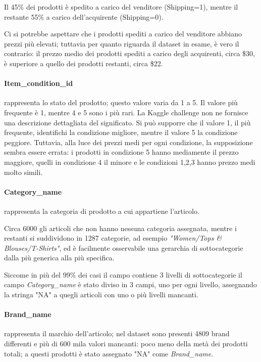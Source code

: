 Il 45\% dei prodotti è spedito a carico del venditore (Shipping=1), mentre il
restante 55\% a carico dell'acquirente (Shipping=0).

Ci si potrebbe aspettare che i prodotti spediti a carico del venditore abbiano
prezzi più elevati; tuttavia  per quanto riguarda il dataset in
esame, è vero il contrario: il prezzo medio dei prodotti spediti a carico degli
acquirenti, circa \$30, è superiore a quello dei prodotti restanti,
circa \$22.


\paragraph{Item\_condition\_id} rappresenta lo stato del prodotto; questo valore
varia da 1 a 5. Il valore più frequente è 1, mentre 4 e 5 sono i più rari. La
Kaggle challenge non ne fornisce una descrizione dettagliata del significato. Si
può supporre che il valore 1, il più frequente, identifichi la condizione
migliore, mentre il valore 5 la condizione peggiore. Tuttavia, alla luce dei
prezzi medi per ogni condizione, la supposizione sembra essere errata: i
prodotti in condizione 5 hanno mediamente il prezzo maggiore, quelli in
condizione 4 il minore e le condizioni 1,2,3 hanno prezzo medi molto simili.

\paragraph{Category\_name} rappresenta la categoria di prodotto a cui appartiene
l'articolo.

Circa 6000 gli articoli che non hanno nessuna categoria assegnata, mentre i
restanti si suddividono in 1287 categorie, ad esempio \textit{"Women/Tops \&
Blouses/T-Shirts"}, ed è facilmente osservabile una gerarchia di
sottocategorie dalla più generica alla più specifica.


Siccome in più del 99\% dei casi il campo contiene 3 livelli di sottocategorie
il campo \textit{Category\_name} è stato diviso in 3 campi, uno per ogni livello,
assegnando la stringa "NA" a quegli articoli con uno o più livelli mancanti.

\paragraph{Brand\_name} rappresenta il marchio dell'articolo; nel dataset sono
presenti 4809 brand differenti e più di 600 mila valori mancanti: poco meno
della metà dei prodotti totali; a questi prodotti è stato assegnato "NA" come \textit{Brand\_name}.

